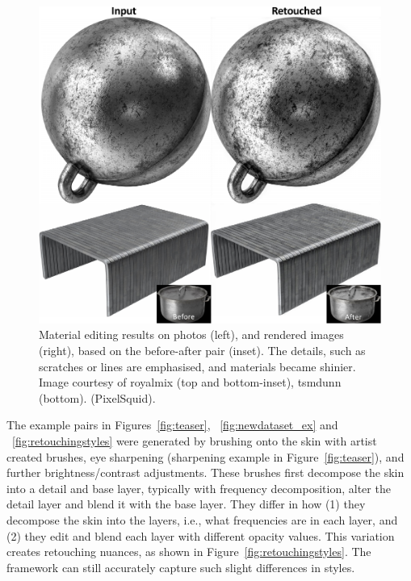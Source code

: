 \begin{figure}[th] %
	\centering
	\includegraphics[width=0.8\columnwidth]{Chapters/detail-retouching-figs/MaterialResults.pdf}
    \caption{\label{fig:material_res}Material editing results on photos (left), and rendered images (right), based on the before-after pair (inset). The details, such as scratches or lines are emphasised, and materials became shinier. Image courtesy of royalmix (top and bottom-inset), tsmdunn (bottom). (PixelSquid).}

\end{figure}

The example pairs in Figures~\ref{fig:teaser}, ~\ref{fig:newdataset_ex}  and ~\ref{fig:retouchingstyles} were generated by brushing onto the skin with artist created brushes, eye sharpening (sharpening example in Figure~\ref{fig:teaser}), and further brightness/contrast adjustments. These brushes first decompose the skin into a detail and base layer, typically with frequency decomposition, alter the detail layer and blend it with the base layer. They differ in how (1) they decompose the skin into the layers, i.e., what frequencies are in each layer, and (2) they edit and blend each layer with different opacity values. This variation creates retouching nuances, as shown in Figure~\ref{fig:retouchingstyles}. The framework can still accurately capture such slight differences in styles. 

